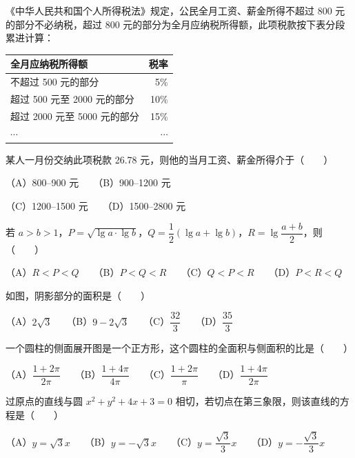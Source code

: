 \begin{question}
《中华人民共和国个人所得税法》规定，公民全月工资、薪金所得不超过 800 元的部分不必纳税，超过 800 元的部分为全月应纳税所得额，此项税款按下表分段累进计算：

\begin{center}
\begin{tabular}{lr}
\toprule
全月应纳税所得额 & 税率 \\
\midrule
不超过 500 元的部分 & 5\% \\
超过 500 元至 2000 元的部分 & 10\% \\
超过 2000 元至 5000 元的部分 & 15\% \\
$\cdots$ & $\cdots$ \\
\bottomrule
\end{tabular}
\end{center}

某人一月份交纳此项税款 26.78 元，则他的当月工资、薪金所得介于\mbox{（　　）}

（A）800–900 元　　（B）900–1200 元

（C）1200–1500 元　　（D）1500–2800 元

\end{question}
\begin{question}
若 $a>b>1$，$P=\sqrt{\lg a\cdot\lg b}$，$Q=\dfrac12(\lg a+\lg b)$，$R=\lg\dfrac{a+b}{2}$，则\mbox{（　　）}

（A）$R<P<Q$　　（B）$P<Q<R$　　（C）$Q<P<R$　　（D）$P<R<Q$

\Needspace{0.4\textheight}
\end{question}
\begin{question}
如图，阴影部分的面积是\mbox{（　　）}
\nopagebreak[4]
\begin{center}\end{center}
\nopagebreak[4]
（A）$2\sqrt3$　　（B）$9-2\sqrt3$　　（C）$\dfrac{32}{3}$　　（D）$\dfrac{35}{3}$

\end{question}
\begin{question}
一个圆柱的侧面展开图是一个正方形，这个圆柱的全面积与侧面积的比是\mbox{（　　）}

（A）$\dfrac{1+2\pi}{2\pi}$　　（B）$\dfrac{1+4\pi}{4\pi}$　　（C）$\dfrac{1+2\pi}{\pi}$　　（D）$\dfrac{1+4\pi}{2\pi}$

\end{question}
\begin{question}
过原点的直线与圆 $x^2+y^2+4x+3=0$ 相切，若切点在第三象限，则该直线的方程是\mbox{（　　）}

（A）$y=\sqrt3x$　　（B）$y=-\sqrt3x$　　（C）$y=\dfrac{\sqrt3}{3}x$　　（D）$y=-\dfrac{\sqrt3}{3}x$

\end{question}
